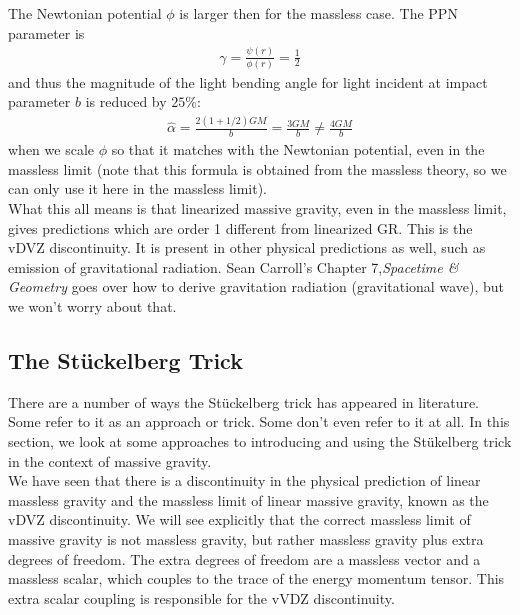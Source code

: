 \documentclass{book}
\theoremstyle{definition}
\newcommand{\f}[2]{\frac{#1}{#2}}
\begin{document}
The Newtonian potential $\phi$ is larger then for the massless case. The PPN parameter is
\begin{align}
\boxed{\gamma = \f{\psi(r)}{\phi(r)} = \f{1}{2}}
\end{align} 
and thus the magnitude of the light bending angle for light incident at impact parameter $b$ is reduced by $25\%$:
\begin{align}
\boxed{\hat{\alpha} = \f{2(1+ 1/2)GM}{b} = \f{3GM}{b} \neq \f{4GM}{b}}
\end{align}
when we scale $\phi$ so that it matches with the Newtonian potential, even in the massless limit (note that this formula is obtained from the massless theory, so we can only use it here in the massless limit). \\

What this all means is that linearized massive gravity, even in the massless limit, gives predictions which are order 1 different from linearized GR. This is the vDVZ discontinuity. It is present in other physical predictions as well, such as emission of gravitational radiation. Sean Carroll's Chapter 7,\textit{Spacetime \& Geometry} goes over how to derive gravitation radiation (gravitational wave), but we won't worry about that.


















\newpage

\subsection{The St\"{u}ckelberg Trick}

There are a number of ways the St\"{u}ckelberg trick has appeared in literature. Some refer to it as an approach or trick. Some don't even refer to it at all. In this section, we look at some approaches to introducing and using the St\"{u}kelberg trick in the context of massive gravity.\\

We have seen that there is a discontinuity in the physical prediction of linear massless gravity and the massless limit of linear massive gravity, known as the vDVZ discontinuity. We will see explicitly that the correct massless limit of massive gravity is not massless gravity, but rather massless gravity plus extra degrees of freedom. The extra degrees of freedom are a massless vector and a massless scalar, which couples to the trace of the energy momentum tensor. This extra scalar coupling is responsible for the vVDZ discontinuity. \\
\end{document}
